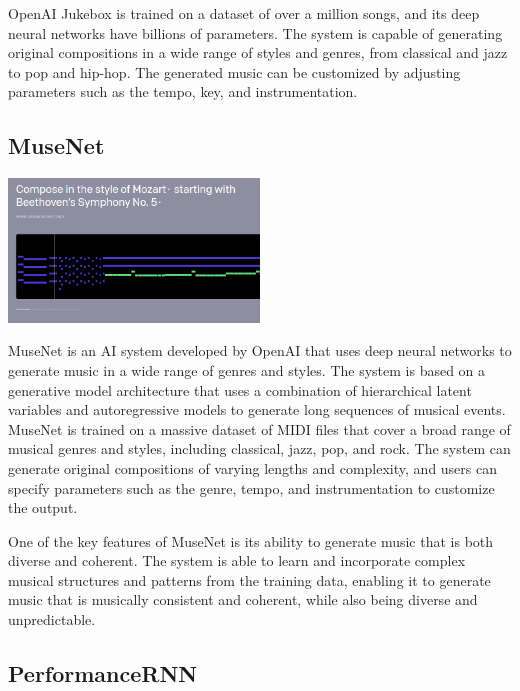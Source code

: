 \documentclass[]{MSword}
\begin{document}
\par{OpenAI Jukebox is trained on a dataset of over a million songs, and its deep neural networks have billions of parameters. The system is capable of generating original compositions in a wide range of styles and genres, from classical and jazz to pop and hip-hop. The generated music can be customized by adjusting parameters such as the tempo, key, and instrumentation.}

\subsection*{MuseNet}

\begin{center}
  \includegraphics[width=0.5\textwidth]{img/musenet.png}
\end{center}

\par{MuseNet\cite{musenet} is an AI system developed by OpenAI that uses deep neural networks to generate music in a wide range of genres and styles. The system is based on a generative model architecture that uses a combination of hierarchical latent variables and autoregressive models to generate long sequences of musical events. MuseNet is trained on a massive dataset of MIDI files that cover a broad range of musical genres and styles, including classical, jazz, pop, and rock. The system can generate original compositions of varying lengths and complexity, and users can specify parameters such as the genre, tempo, and instrumentation to customize the output.}

\par{One of the key features of MuseNet is its ability to generate music that is both diverse and coherent. The system is able to learn and incorporate complex musical structures and patterns from the training data, enabling it to generate music that is musically consistent and coherent, while also being diverse and unpredictable.}

\subsection*{PerformanceRNN}
\end{document}
